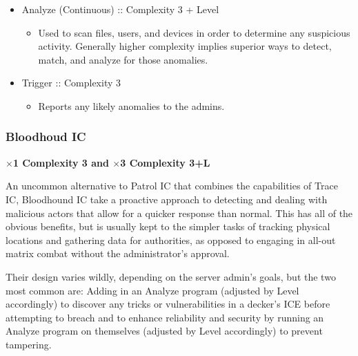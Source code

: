 \begin{multicols}{2}
	\begin{itemize}
		\itemsep 0pt
		\item Analyze (Continuous) :: Complexity 3 + Level
		\begin{itemize}
			\itemsep 0pt
			\item Used to scan files, users, and devices in order to determine any suspicious activity. Generally higher complexity implies superior ways to detect, match, and analyze for those anomalies.
		\end{itemize}
		\item Trigger :: Complexity 3
		\begin{itemize}
			\itemsep 0pt
			\item Reports any likely anomalies to the admins.
		\end{itemize}
	\end{itemize}

	\subsubsection{Bloodhoud IC}
	
	\textbf{$\times$1 Complexity 3 and $\times$3 Complexity 3+L}
	
	An uncommon alternative to Patrol IC that combines the capabilities of Trace IC, Bloodhound IC take a proactive approach to detecting and dealing with malicious actors that allow for a quicker response than normal. This has all of the obvious benefits, but is usually kept to the simpler tasks of tracking physical locations and gathering data for authorities, as opposed to engaging in all-out matrix combat without the administrator's approval.
	
	Their design varies wildly, depending on the server admin's goals, but the two most common are: Adding in an Analyze program (adjusted by Level accordingly) to discover any tricks or vulnerabilities in a decker's ICE before attempting to breach and to enhance reliability and security by running an Analyze program on themselves (adjusted by Level accordingly) to prevent tampering.
	

\end{multicols}
